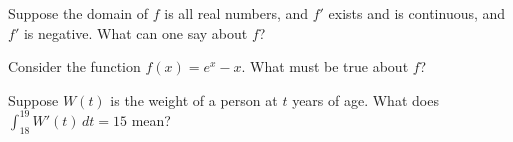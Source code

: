 \documentclass{ximera}
\begin{document}
\begin{shuffle}


\begin{problem}
  Suppose the domain of $f$ is all real numbers, and $f'$ exists and is continuous, and $f'$ is negative.  What can one say about $f$?
  \begin{multipleChoice}
  \end{multipleChoice}
\end{problem}

\begin{problem}
  Consider the function $f(x) = e^x - x$.  What must be true about $f$?
  \begin{multipleChoice}
  \end{multipleChoice}
\end{problem}

\begin{problem}
  Suppose $W(t)$ is the weight of a person at $t$ years of age.  What does $\int_{18}^{19} W'(t) \, dt = 15$ mean?
  \begin{multipleChoice}
  \end{multipleChoice}
\end{problem}





\end{shuffle}
\end{document}
